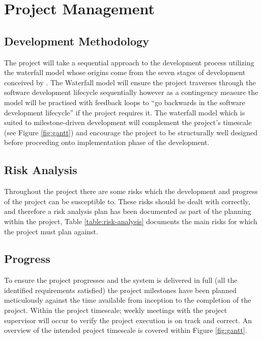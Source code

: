 \documentclass[11pt]{report}
\begin{document}
\chapter{Project Management}
\section{Development Methodology}
The project will take a sequential approach to the development process utilizing the waterfall model whose origins come from the seven stages of development conceived by \cite{RoyceManagingDevelopmentLarge1987}. The Waterfall model will ensure the project traverses through the software development lifecycle sequentially however as a contingency measure the model will be practised with feedback loops to ``go backwards in the software development lifecycle'' if the project requires it. The waterfall model which is suited to milestone-driven development will complement the project's timescale (see Figure \ref{fig:gantt}) and encourage the project to be structurally well designed before proceeding onto implementation phase of the development.

\section{Risk Analysis}
Throughout the project there are some risks which the development and progress of the project can be susceptible to. These risks should be dealt with correctly, and therefore a risk analysis plan has been documented as part of the planning within the project, Table \ref{table:risk-analysis} documents the main risks for which the project must plan against.

\section{Progress}
To ensure the project progresses and the system is delivered in full (all the identified requirements satisfied) the project milestones have been planned meticulously against the time available from inception to the completion of the project. Within the project timescale; weekly meetings with the project supervisor will occur to verify the project execution is on track and correct. An overview of the intended project timescale is covered within Figure \ref{fig:gantt}.

\clearpage
\end{document}

